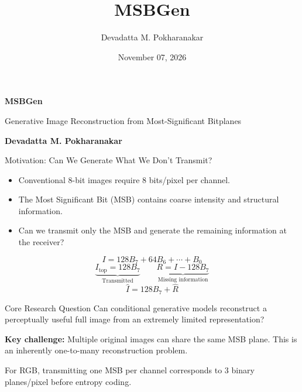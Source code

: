 \documentclass[aspectratio=169, 11pt]{beamer}
\title{MSBGen}
\author{Devadatta M. Pokharanakar}
\institute{MTech DS, IIT PKD}
\date{November 07, 2026}
\begin{document}

\begin{frame}
    \begin{center}
        {\LARGE\bfseries{} MSBGen}
        
        \vfill
        {\normalsize Generative Image Reconstruction from
        Most-Significant Bitplanes}

        \vfill
        {\large\bfseries Devadatta M. Pokharanakar}
    \end{center}
\end{frame}

\begin{frame}{Motivation: Can We Generate What We Don't Transmit?}
    \begin{itemize}
        \item Conventional 8-bit images require 8 bits/pixel per channel.
        \item The Most Significant Bit (MSB) contains coarse intensity and structural information.
        \item Can we transmit only the MSB and generate the remaining information at the receiver?
    \end{itemize}

    \vspace{-0.9cm}
    \begin{center}
        \[
            I = 128B_7 + 64B_6 + \cdots + B_0
        \]
        \[
            \underbrace{I_{\text{top}}=128B_7}_{\text{Transmitted}}
            \qquad
            \underbrace{R=I-128B_7}_{\text{Missing information}}
        \]
        \[
            \boxed{\hat I = 128B_7 + \hat R}
        \]
    \end{center}

    \vspace{-0.3cm}
    \begin{block}{Core Research Question}
        Can conditional generative models reconstruct a perceptually useful full image from an extremely limited representation?
    \end{block}

    \textbf{Key challenge:} Multiple original images can share the same MSB plane. This is an inherently one-to-many reconstruction problem.

    \vspace{0.1cm}
    \footnotesize
    For RGB, transmitting one MSB per channel corresponds to 3 binary planes/pixel before entropy coding.
\end{frame}
\end{document}
